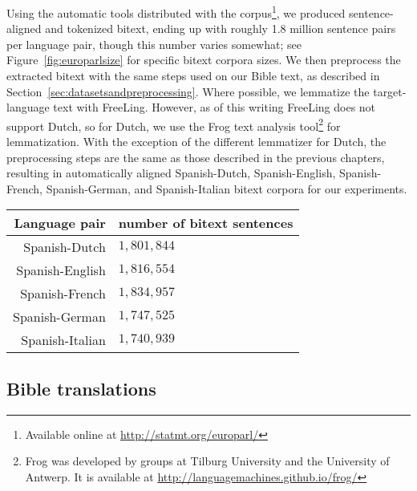 Using the automatic tools distributed with the corpus\footnote{Available
online at \url{http://statmt.org/europarl/}}, we produced sentence-aligned
and tokenized bitext, ending up with roughly 1.8 million sentence pairs per
language pair, though this number varies somewhat; see
Figure~\ref{fig:europarlsize} for specific bitext corpora sizes.
We then preprocess the extracted bitext with the same steps used on our Bible
text, as described in Section~\ref{sec:datasetsandpreprocessing}. Where
possible, we lemmatize the target-language text with FreeLing. However, as of
this writing FreeLing does not support Dutch, so for Dutch, we use the Frog
text analysis tool\footnote{Frog was developed by groups at Tilburg University
and the University of Antwerp. It is available at
\url{http://languagemachines.github.io/frog/}} \cite{tadpole2007} for
lemmatization. With the exception of the different lemmatizer for Dutch, the
preprocessing steps are the same as those described in the previous chapters,
resulting in automatically aligned Spanish-Dutch, Spanish-English,
Spanish-French, Spanish-German, and Spanish-Italian bitext corpora for our
experiments.

\begin{figure*}
  \begin{centering}
  \begin{tabular}{|r|l|}
    \hline
    Language pair & number of bitext sentences \\
    \hline
    Spanish-Dutch & $1,801,844$ \\
    \hline
    Spanish-English & $1,816,554$ \\
    \hline
    Spanish-French & $1,834,957$ \\
    \hline
    Spanish-German & $1,747,525$ \\
    \hline
    Spanish-Italian & $1,740,939$ \\
    \hline
  \end{tabular}
  \end{centering}
  \caption{Classifier features based on classifier stacking, used in the
  experiments in this chapter.}
  \label{fig:europarlsize}
\end{figure*}

\subsection{Bible translations}

